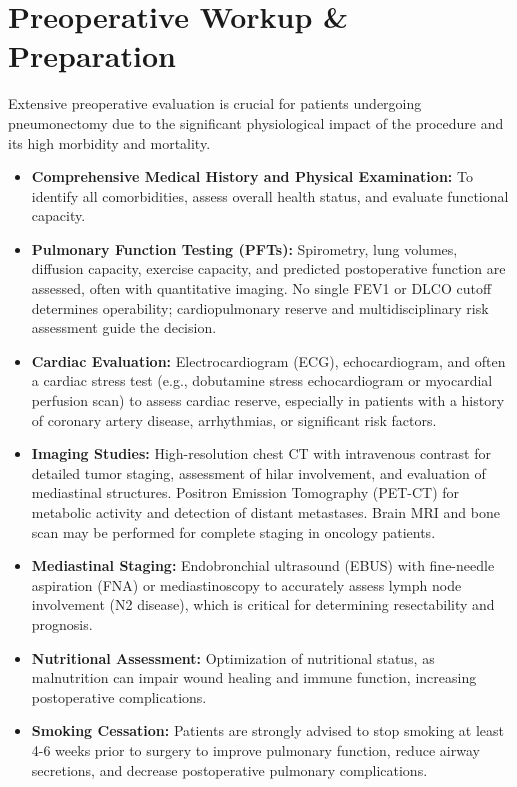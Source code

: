 \section*{Preoperative Workup \& Preparation}
Extensive preoperative evaluation is crucial for patients undergoing pneumonectomy due to the significant physiological impact of the procedure and its high morbidity and mortality.

\begin{itemize}
  \item \textbf{Comprehensive Medical History and Physical Examination:} To identify all comorbidities, assess overall health status, and evaluate functional capacity.
  
  \item \textbf{Pulmonary Function Testing (PFTs):} Spirometry, lung volumes, diffusion capacity, exercise capacity, and predicted postoperative function are assessed, often with quantitative imaging. No single FEV1 or DLCO cutoff determines operability; cardiopulmonary reserve and multidisciplinary risk assessment guide the decision.
  
  \item \textbf{Cardiac Evaluation:} Electrocardiogram (ECG), echocardiogram, and often a cardiac stress test (e.g., dobutamine stress echocardiogram or myocardial perfusion scan) to assess cardiac reserve, especially in patients with a history of coronary artery disease, arrhythmias, or significant risk factors.
  
  \item \textbf{Imaging Studies:} High-resolution chest CT with intravenous contrast for detailed tumor staging, assessment of hilar involvement, and evaluation of mediastinal structures. Positron Emission Tomography (PET-CT) for metabolic activity and detection of distant metastases. Brain MRI and bone scan may be performed for complete staging in oncology patients.
  
  \item \textbf{Mediastinal Staging:} Endobronchial ultrasound (EBUS) with fine-needle aspiration (FNA) or mediastinoscopy to accurately assess lymph node involvement (N2 disease), which is critical for determining resectability and prognosis.
  
  \item \textbf{Nutritional Assessment:} Optimization of nutritional status, as malnutrition can impair wound healing and immune function, increasing postoperative complications.
  
  \item \textbf{Smoking Cessation:} Patients are strongly advised to stop smoking at least 4-6 weeks prior to surgery to improve pulmonary function, reduce airway secretions, and decrease postoperative pulmonary complications.
  

\end{itemize}
